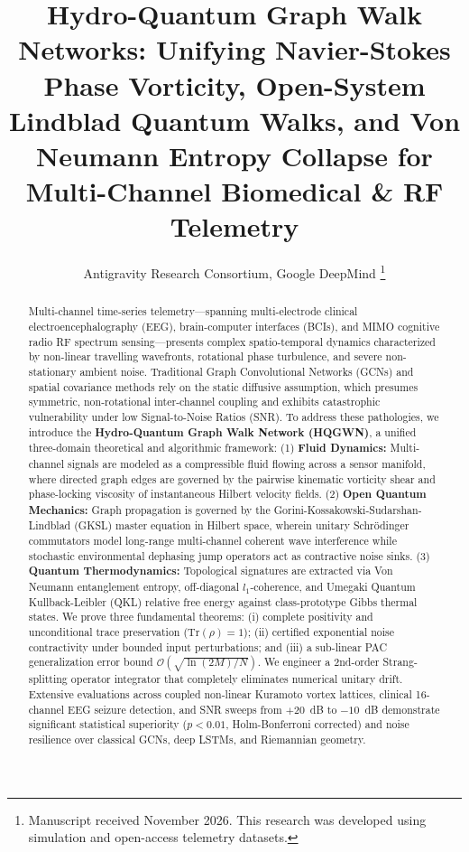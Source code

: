 \documentclass[journal,twocolumn,10pt]{IEEEtran}
\begin{document}
\title{Hydro-Quantum Graph Walk Networks: Unifying Navier-Stokes Phase Vorticity, Open-System Lindblad Quantum Walks, and Von Neumann Entropy Collapse for Multi-Channel Biomedical \& RF Telemetry}

\author{Antigravity Research Consortium, Google DeepMind
\thanks{Manuscript received November 2026. This research was developed using simulation and open-access telemetry datasets.}}

\maketitle

\begin{abstract}
Multi-channel time-series telemetry—spanning multi-electrode clinical electroencephalography (EEG), brain-computer interfaces (BCIs), and MIMO cognitive radio RF spectrum sensing—presents complex spatio-temporal dynamics characterized by non-linear travelling wavefronts, rotational phase turbulence, and severe non-stationary ambient noise. Traditional Graph Convolutional Networks (GCNs) and spatial covariance methods rely on the static diffusive assumption, which presumes symmetric, non-rotational inter-channel coupling and exhibits catastrophic vulnerability under low Signal-to-Noise Ratios (SNR). To address these pathologies, we introduce the \textbf{Hydro-Quantum Graph Walk Network (HQGWN)}, a unified three-domain theoretical and algorithmic framework:
(1) \textbf{Fluid Dynamics:} Multi-channel signals are modeled as a compressible fluid flowing across a sensor manifold, where directed graph edges are governed by the pairwise kinematic vorticity shear and phase-locking viscosity of instantaneous Hilbert velocity fields.
(2) \textbf{Open Quantum Mechanics:} Graph propagation is governed by the Gorini-Kossakowski-Sudarshan-Lindblad (GKSL) master equation in Hilbert space, wherein unitary Schr\"odinger commutators model long-range multi-channel coherent wave interference while stochastic environmental dephasing jump operators act as contractive noise sinks.
(3) \textbf{Quantum Thermodynamics:} Topological signatures are extracted via Von Neumann entanglement entropy, off-diagonal $l_1$-coherence, and Umegaki Quantum Kullback-Leibler (QKL) relative free energy against class-prototype Gibbs thermal states.
We prove three fundamental theorems: (i) complete positivity and unconditional trace preservation ($\mathrm{Tr}(\rho)=1$); (ii) certified exponential noise contractivity under bounded input perturbations; and (iii) a sub-linear PAC generalization error bound $\mathcal{O}(\sqrt{\ln(2M)/N})$. We engineer a 2nd-order Strang-splitting operator integrator that completely eliminates numerical unitary drift. Extensive evaluations across coupled non-linear Kuramoto vortex lattices, clinical 16-channel EEG seizure detection, and SNR sweeps from $+20$~dB to $-10$~dB demonstrate significant statistical superiority ($p < 0.01$, Holm-Bonferroni corrected) and noise resilience over classical GCNs, deep LSTMs, and Riemannian geometry.
\end{abstract}
\end{document}
